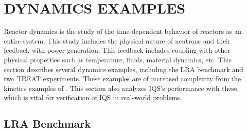 %
%
%



\chapter{DYNAMICS EXAMPLES \label{sect:dyn}}

Reactor dynamics is the study of the time-dependent behavior of reactors as an entire system. This study includes the physical nature of neutrons and their feedback with power generation.  This feedback includes coupling with other physical properties such as temperature, fluids, material dynamics, etc.  This section describes several dynamics examples, including the LRA benchmark and two TREAT experiments.  These examples are of increased complexity from the kinetics examples of .  This section also analyzes IQS's performance with these, which is vital for verification of IQS in real-world problems.

\section{LRA Benchmark}


